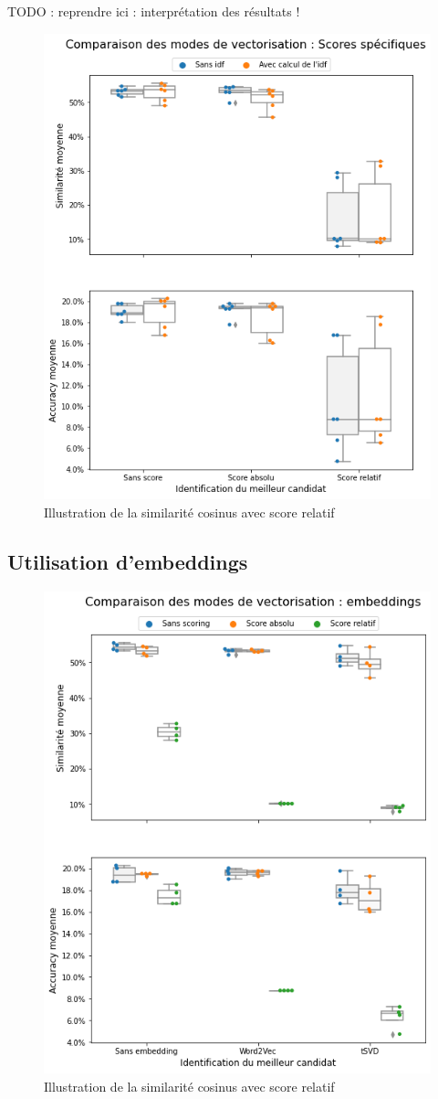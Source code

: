             TODO : reprendre ici : interprétation des résultats !

            \begin{figure}[htbp]
                \begin{center}
                \includegraphics[width=0.6\linewidth]{img/tuning_score.png}
                \end{center}
                \caption{Illustration de la similarité cosinus avec score relatif}
                \label{fig:tuning_score}
            \end{figure}


            \subsection{Utilisation d'embeddings}

            \begin{figure}[htbp]
                \begin{center}
                \includegraphics[width=0.6\linewidth]{img/tuning_embedding.png}
                \end{center}
                \caption{Illustration de la similarité cosinus avec score relatif}
                \label{fig:tuning_embedding}
            \end{figure}

